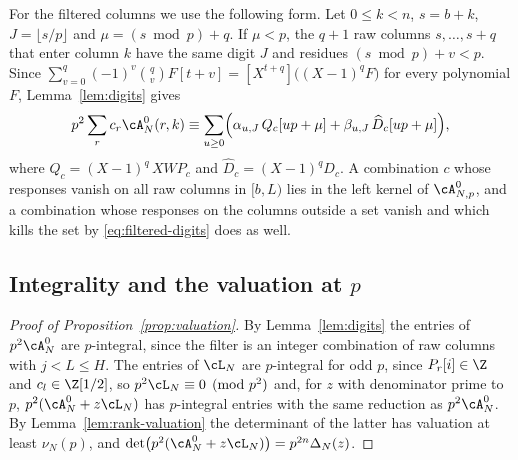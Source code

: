 For the filtered columns we use the following form. Let $0\le k<n$, $s=b+k$, $J=\lfloor s/p\rfloor$ and
$\mu=(s\bmod p)+q$. If $\mu<p$, the $q+1$ raw columns $s,\dots,s+q$ that enter column $k$ have the same
digit $J$ and residues $(s\bmod p)+v<p$. Since
$\sum_{v=0}^q(-1)^v\binom qvF[t+v]=[X^{t+q}]\bigl((X-1)^qF\bigr)$ for every polynomial $F$,
Lemma~\ref{lem:digits} gives
\begin{equation}\label{eq:filtered-digits}
 p^2\sum_rc_r\cA^0_N(r,k)\equiv\sum_{u\ge0}\Bigl(\alpha_{u,J}\,Q_c[up+\mu]+\beta_{u,J}\,\widehat D_c[up+\mu]\Bigr),
\end{equation}
where $Q_c=(X-1)^q\,XWP_c$ and $\widehat D_c=(X-1)^qD_c$. A combination $c$ whose responses vanish on all
raw columns in $[b,L)$ lies in the left kernel of $\cA^0_{N,p}$, and a combination whose responses on the
columns outside a set vanish and which kills the set by \eqref{eq:filtered-digits} does as well.

\subsection{Integrality and the valuation at $p$}
\begin{proof}[Proof of Proposition~\ref{prop:valuation}]
By Lemma~\ref{lem:digits} the entries of $p^2\cA^0_N$ are $p$-integral, since the filter is an integer
combination of raw columns with $j<L\le H$. The entries of $\cL_N$ are $p$-integral for odd $p$, since
$P_r[i]\in\Z$ and $c_l\in\Z[1/2]$, so $p^2\cL_N\equiv0\pmod{p^2}$ and, for $z$ with denominator prime to
$p$, $p^2(\cA^0_N+z\cL_N)$ has $p$-integral entries with the same reduction as $p^2\cA^0_N$. By
Lemma~\ref{lem:rank-valuation} the determinant of the latter has valuation at least $\nu_N(p)$, and
$\det\bigl(p^2(\cA^0_N+z\cL_N)\bigr)=p^{2n}\Delta_N(z)$.
\end{proof}

